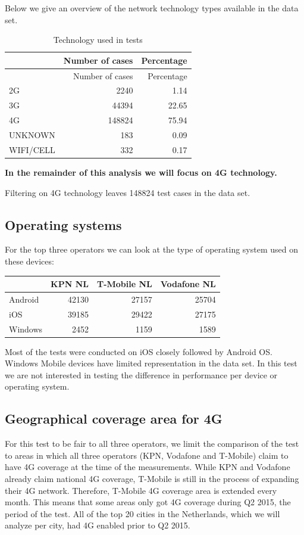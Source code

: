 \documentclass[]{article}
\begin{document}
Below we give an overview of the network technology types available in
the data set.

\begin{longtable}[c]{@{}lrr@{}}
\caption{Technology used in tests}\tabularnewline
\toprule
& Number of cases & Percentage\tabularnewline
\midrule
\endfirsthead
\toprule
& Number of cases & Percentage\tabularnewline
\midrule
\endhead
2G & 2240 & 1.14\tabularnewline
3G & 44394 & 22.65\tabularnewline
4G & 148824 & 75.94\tabularnewline
UNKNOWN & 183 & 0.09\tabularnewline
WIFI/CELL & 332 & 0.17\tabularnewline
\bottomrule
\end{longtable}

\textbf{In the remainder of this analysis we will focus on 4G
technology.}

Filtering on 4G technology leaves 148824 test cases in the data set.

\subsection{Operating systems}\label{operating-systems}

For the top three operators we can look at the type of operating system
used on these devices:

\begin{longtable}[c]{@{}lrrr@{}}
\toprule
& KPN NL & T-Mobile NL & Vodafone NL\tabularnewline
\midrule
\endhead
Android & 42130 & 27157 & 25704\tabularnewline
iOS & 39185 & 29422 & 27175\tabularnewline
Windows & 2452 & 1159 & 1589\tabularnewline
\bottomrule
\end{longtable}

Most of the tests were conducted on iOS closely followed by Android OS.
Windows Mobile devices have limited representation in the data set. In
this test we are not interested in testing the difference in performance
per device or operating system.

\subsection{Geographical coverage area for
4G}\label{geographical-coverage-area-for-4g}

For this test to be fair to all three operators, we limit the comparison
of the test to areas in which all three operators (KPN, Vodafone and
T-Mobile) claim to have 4G coverage at the time of the measurements.
While KPN and Vodafone already claim national 4G coverage, T-Mobile is
still in the process of expanding their 4G network. Therefore, T-Mobile
4G coverage area is extended every month. This means that some areas
only got 4G coverage during Q2 2015, the period of the test. All of the
top 20 cities in the Netherlands, which we will analyze per city, had 4G
enabled prior to Q2 2015.
\end{document}
